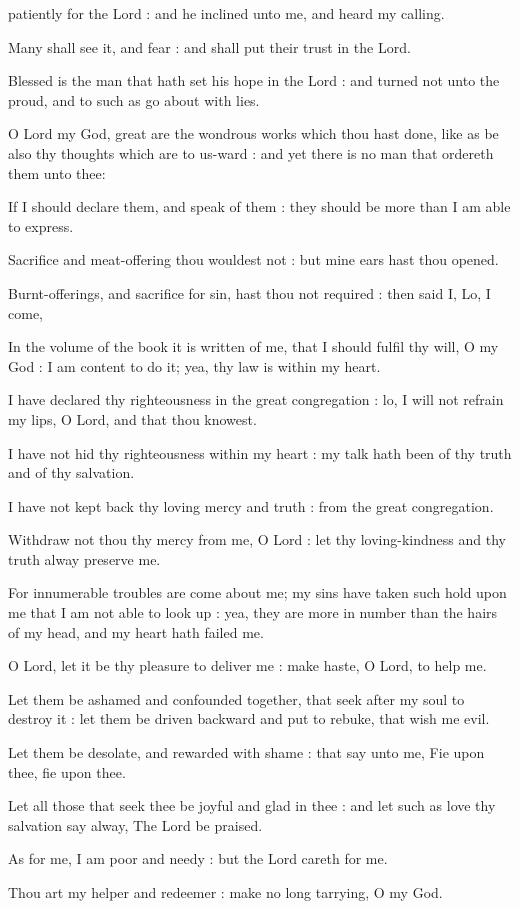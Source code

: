  patiently for the Lord : and he inclined unto me, and heard my calling.\par
{}
Many shall see it, and fear : and shall put their trust in the Lord.\par
{}Blessed is the man that hath set his hope in the Lord : and turned not unto the proud, and to such as go about with lies.\par
{}O Lord my God, great are the wondrous works which thou hast done, like as be also thy thoughts which are to us-ward : and yet there is no man that ordereth them unto thee:\par
{}If I should declare them, and speak of them : they should be more than I am able to express.\par
{}Sacrifice and meat-offering thou wouldest not : but mine ears hast thou opened.\par
{}Burnt-offerings, and sacrifice for sin, hast thou not required : then said I, Lo, I come,\par
{}In the volume of the book it is written of me, that I should fulfil thy will, O my God : I am content to do it; yea, thy law is within my heart.\par
{}I have declared thy righteousness in the great congregation : lo, I will not refrain my lips, O Lord, and that thou knowest.\par
{}I have not hid thy righteousness within my heart : my talk hath been of thy truth and of thy salvation.\par
{}I have not kept back thy loving mercy and truth : from the great congregation.\par
{}Withdraw not thou thy mercy from me, O Lord : let thy loving-kindness and thy truth alway preserve me.\par
{}For innumerable troubles are come about me; my sins have taken such hold upon me that I am not able to look up : yea, they are more in number than the hairs of my head, and my heart hath failed me.\par
{}O Lord, let it be thy pleasure to deliver me : make haste, O Lord, to help me.\par
{}Let them be ashamed and confounded together, that seek after my soul to destroy it : let them be driven backward and put to rebuke, that wish me evil.\par
{}Let them be desolate, and rewarded with shame : that say unto me, Fie upon thee, fie upon thee.\par
{}Let all those that seek thee be joyful and glad in thee : and let such as love thy salvation say alway, The Lord be praised.\par
{}As for me, I am poor and needy : but the Lord careth for me.\par
{}Thou art my helper and redeemer : make no long tarrying, O my God.\par

